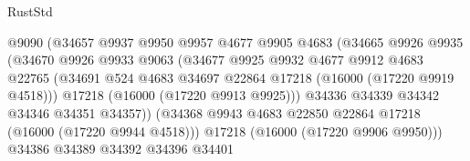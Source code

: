 \begin{lexlean}{RustStd}
\begin{coremodule}
                                      @9090
                                      (@34657
                                        @9937
                                        @9950
                                        @9957
                                        @4677
                                        @9905
                                        @4683
                                        (@34665
                                          @9926
                                          @9935
                                          (@34670
                                            @9926
                                            @9933
                                            @9063
                                            (@34677
                                              @9925
                                              @9932
                                              @4677
                                              @9912
                                              @4683
                                              @22765
                                              (@34691
                                                @524
                                                @4683
                                                @34697
                                                @22864
                                                @17218
                                                (@16000 (@17220 @9919 @4518)))
                                              @17218
                                              (@16000 (@17220 @9913 @9925)))
                                            @34336
                                            @34339
                                            @34342
                                            @34346
                                            @34351
                                            @34357))
                                        (@34368
                                          @9943
                                          @4683
                                          @22850
                                          @22864
                                          @17218
                                          (@16000 (@17220 @9944 @4518)))
                                        @17218
                                        (@16000 (@17220 @9906 @9950)))
                                      @34386
                                      @34389
                                      @34392
                                      @34396
                                      @34401

\end{coremodule}
\end{lexlean}

